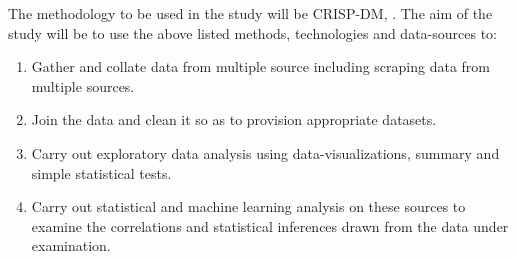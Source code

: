 \documentclass[11pt,twocolumn]{article}
\begin{document}
The methodology to be used in the study will be CRISP-DM, \citep{chapman2000crisp}. The aim of the study will be to use the above listed methods, technologies and data-sources to:
\begin{enumerate}
\item Gather and collate data from multiple source including scraping data from multiple sources.
\item Join the data and clean it so as to provision appropriate datasets.
\item Carry out exploratory data analysis using data-visualizations, summary and simple statistical tests.
\item Carry out statistical and machine learning analysis on these sources to examine the correlations and statistical inferences drawn from the data under examination.
\end{enumerate}
\end{document}
